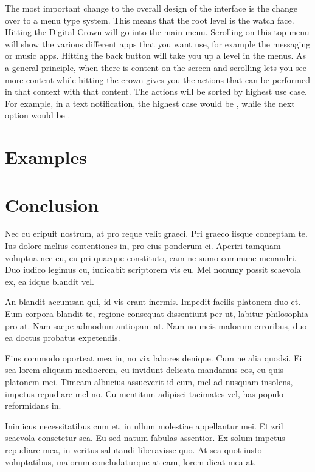 \documentclass[journal,letterpaper]{article}
\begin{document}
    The most important change to the overall design of the interface is the change over to a menu type system. This means that the root level is the watch face. Hitting the Digital Crown will go into the main menu. Scrolling on this top menu will show the various different apps that you want use, for example the messaging or music apps. Hitting the back button will take you up a level in the menus. As a general principle, when there is content on the screen and scrolling lets you see more content while hitting the crown gives you the actions that can be performed in that context with that content. The actions will be sorted by highest use case. For example, in a text notification, the highest case would be , while the next option would be . 

    \section{Examples}
    \label{examples}

    \section{Conclusion}
    \label{conclusion}

    Nec cu eripuit nostrum, at pro reque velit graeci. Pri graeco iisque conceptam te. Ius dolore melius contentiones in, pro eius ponderum ei. Aperiri tamquam voluptua nec cu, eu pri quaeque constituto, eam ne sumo commune menandri. Duo iudico legimus cu, iudicabit scriptorem vis eu. Mel nonumy possit scaevola ex, ea idque blandit vel.

    An blandit accumsan qui, id vis erant inermis. Impedit facilis platonem duo et. Eum corpora blandit te, regione consequat dissentiunt per ut, labitur philosophia pro at. Nam saepe admodum antiopam at. Nam no meis malorum erroribus, duo ea doctus probatus expetendis.

    Eius commodo oporteat mea in, no vix labores denique. Cum ne alia quodsi. Ei sea lorem aliquam mediocrem, eu invidunt delicata mandamus eos, cu quis platonem mei. Timeam albucius assueverit id eum, mel ad nusquam insolens, impetus repudiare mel no. Cu mentitum adipisci tacimates vel, has populo reformidans in.

    Inimicus necessitatibus cum et, in ullum molestiae appellantur mei. Et zril scaevola consetetur sea. Eu sed natum fabulas assentior. Ex solum impetus repudiare mea, in veritus salutandi liberavisse quo. At sea quot iusto voluptatibus, maiorum concludaturque at eam, lorem dicat mea at.
\end{document}
